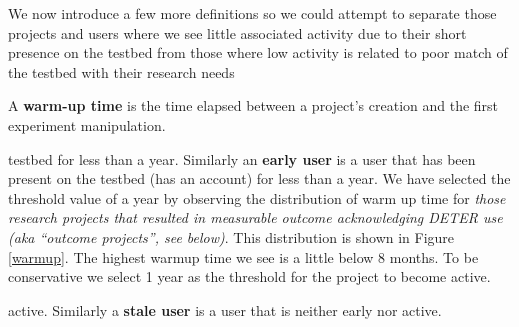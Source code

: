 We now introduce a few more definitions so we could attempt to separate
those projects and users where we see little associated activity due to
their short presence on the testbed from those where low activity is
related to poor match of the testbed with their research needs

A \textbf{warm-up time} is the time elapsed between a project's creation
and the first experiment manipulation.

testbed for less than a year. Similarly an \textbf{early user} is a user
that has been present on the testbed (has an account) for less than a
year. We have selected the threshold value of a year by observing the
distribution of warm up time for \textit{those research projects that
resulted in measurable outcome acknowledging DETER use (aka ``outcome
projects'', see below)}. This distribution is shown in Figure
\ref{warmup}. The highest warmup time we see is a little below 8 months.
To be conservative we select 1 year as the threshold for the project to
become active.

active. Similarly a \textbf{stale user} is a user that is neither early
nor active.

